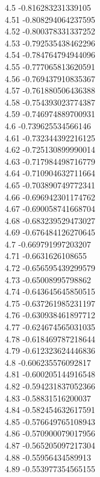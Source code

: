 {4.5	-0.816283231339105\\
4.51	-0.808294064237595\\
4.52	-0.800378331337252\\
4.53	-0.792535438462296\\
4.54	-0.784764794944096\\
4.55	-0.777065813620591\\
4.56	-0.769437910835367\\
4.57	-0.761880506436388\\
4.58	-0.754393023774387\\
4.59	-0.746974889700931\\
4.6	-0.739625534566146\\
4.61	-0.732344392216125\\
4.62	-0.725130899990014\\
4.63	-0.717984498716779\\
4.64	-0.710904632711664\\
4.65	-0.703890749772341\\
4.66	-0.696942301174762\\
4.67	-0.690058741668704\\
4.68	-0.683239529473027\\
4.69	-0.676484126270645\\
4.7	-0.669791997203207\\
4.71	-0.6631626108655\\
4.72	-0.656595439299579\\
4.73	-0.65008995798862\\
4.74	-0.643645645850515\\
4.75	-0.637261985231197\\
4.76	-0.630938461897712\\
4.77	-0.624674565031035\\
4.78	-0.618469787218644\\
4.79	-0.612323624446836\\
4.8	-0.606235576092817\\
4.81	-0.600205144916548\\
4.82	-0.594231837052366\\
4.83	-0.58831516200037\\
4.84	-0.582454632617591\\
4.85	-0.576649765108943\\
4.86	-0.570900079017956\\
4.87	-0.565205097217304\\
4.88	-0.55956434589913\\
4.89	-0.553977354565155\\
}
